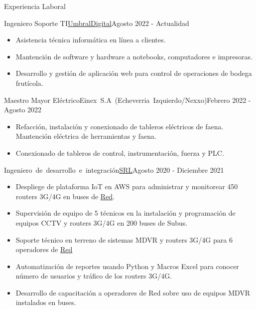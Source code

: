 \documentclass[]{mcdowellcv}
\begin{document}
	\makeheader
	
	\begin{cvsection}{Experiencia Laboral}
		\begin{cvsubsection}{Ingeniero Soporte TI}{\mbox{\href{https://umbraldigital.cl/}{UmbralDigital}}}{Agosto 2022 - Actualidad}		
			\begin{itemize}
				\item Asistencia técnica informática en línea a clientes.
				\item Mantención de software y hardware a notebooks, computadores e impresoras.
				\item Desarrollo y gestión de aplicación web para control de operaciones de bodega frutícola.
			\end{itemize}
		\end{cvsubsection}
		\begin{cvsubsection}{Maestro Mayor Eléctrico}{\mbox{Einex S.A (Echeverria Izquierdo/Nexxo)}}{Febrero 2022 - Agosto 2022}		
			\begin{itemize}
				\item Refacción, instalación y conexionado de tableros eléctricos de faena. Mantención eléctrica de herramientas y faena.
				\item Conexionado de tableros de control, instrumentación, fuerza y PLC.
			\end{itemize}
		\end{cvsubsection}
		
		\begin{cvsubsection}{\mbox{Ingeniero de desarrollo e integración}}{\href{https://www.srl.cl/empresa/}{SRL}}{Agosto 2020 - Diciembre 2021}	
			\begin{itemize}
				\item Despliege de plataforma IoT en AWS para administrar y monitorear 450 routers 3G/4G en buses de \href{https://www.red.cl/}{Red}. 
				\item Supervisión de equipo de 5 técnicos en la instalación y programación de equipos CCTV y routers 3G/4G en 200 buses de Subus.
				\item Soporte técnico en terreno de sistemas MDVR y routers 3G/4G para 6 operadores de \href{https://www.red.cl/}{Red}
				\item Automatización de reportes usando Python y Macros Excel para conocer número de usuarios y tráfico de los routers 3G/4G.
				\item Desarrollo de capacitación a operadores de Red sobre uso de equipos MDVR instalados en buses.
			\end{itemize}
		\end{cvsubsection}
		

\end{cvsection}
\end{document}
